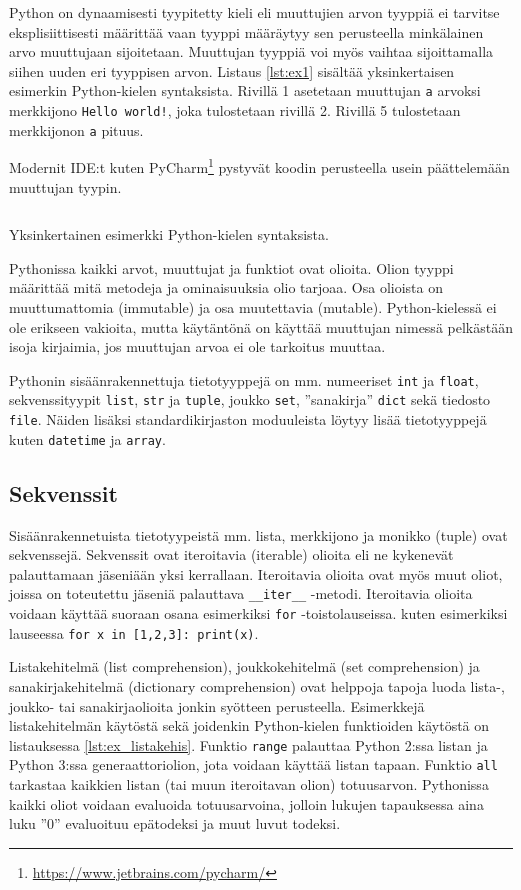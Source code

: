 \documentclass[finnish]{tktltiki2}
\theoremstyle{definition}
\theoremstyle{remark}
\begin{document}
Python on dynaamisesti tyypitetty kieli eli muuttujien arvon tyyppiä ei tarvitse eksplisiittisesti määrittää vaan tyyppi määräytyy sen perusteella minkälainen arvo muuttujaan sijoitetaan. Muuttujan tyyppiä voi myös vaihtaa sijoittamalla siihen uuden eri tyyppisen arvon. Listaus \ref{lst:ex1} sisältää yksinkertaisen esimerkin Python-kielen syntaksista. Rivillä 1 asetetaan muuttujan \verb|a| arvoksi merkkijono \verb|Hello world!|, joka tulostetaan rivillä 2. Rivillä 5 tulostetaan merkkijonon \verb|a| pituus.

Modernit IDE:t kuten PyCharm\footnote{\url{https://www.jetbrains.com/pycharm/}} pystyvät koodin perusteella usein päättelemään muuttujan tyypin.

\begin{listing}
    \inputminted[linenos]{python}{code/foo.py}
    \caption{Yksinkertainen esimerkki Python-kielen syntaksista.}
    \label{lst:ex1}
\end{listing}

Pythonissa kaikki arvot, muuttujat ja funktiot ovat olioita. Olion tyyppi määrittää mitä metodeja ja ominaisuuksia olio tarjoaa. Osa olioista on muuttumattomia (immutable) ja osa muutettavia (mutable). Python-kielessä ei ole erikseen vakioita, mutta käytäntönä on käyttää muuttujan nimessä pelkästään isoja kirjaimia, jos muuttujan arvoa ei ole tarkoitus muuttaa.

Pythonin sisäänrakennettuja tietotyyppejä on mm. numeeriset \verb|int| ja \verb|float|, sekvenssityypit \verb|list|, \verb|str| ja \verb|tuple|, joukko \verb|set|, ''sanakirja'' \verb|dict| sekä tiedosto \verb|file|. Näiden lisäksi standardikirjaston moduuleista löytyy lisää tietotyyppejä kuten \verb|datetime| ja \verb|array|.

\subsection{Sekvenssit}

Sisäänrakennetuista tietotyypeistä mm. lista, merkkijono ja monikko (tuple) ovat sekvenssejä. Sekvenssit ovat iteroitavia (iterable) olioita eli ne kykenevät palauttamaan jäseniään yksi kerrallaan. Iteroitavia olioita ovat myös muut oliot, joissa on toteutettu jäseniä palauttava \verb|__iter__| -metodi. Iteroitavia olioita voidaan käyttää suoraan osana esimerkiksi \verb|for| -toistolauseissa. kuten esimerkiksi lauseessa \verb|for x in [1,2,3]: print(x)|.

Listakehitelmä (list comprehension), joukkokehitelmä (set comprehension) ja sanakirjakehitelmä (dictionary comprehension) ovat helppoja tapoja luoda lista-, joukko- tai sanakirjaolioita jonkin syötteen perusteella. Esimerkkejä listakehitelmän käytöstä sekä joidenkin Python-kielen funktioiden käytöstä on listauksessa \ref{lst:ex_listakehis}. Funktio \verb|range| palauttaa Python 2:ssa listan ja Python 3:ssa generaattoriolion, jota voidaan käyttää listan tapaan. Funktio \verb|all| tarkastaa kaikkien listan (tai muun iteroitavan olion) totuusarvon. Pythonissa kaikki oliot voidaan evaluoida totuusarvoina, jolloin lukujen tapauksessa aina luku ''0'' evaluoituu epätodeksi ja muut luvut todeksi.
\end{document}
